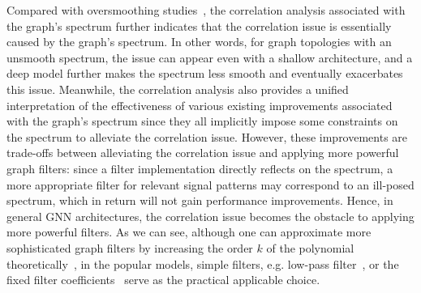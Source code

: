 \documentclass[nohyperref]{article}
\theoremstyle{plain}
\theoremstyle{definition}
\theoremstyle{remark}
\begin{document}
Compared with oversmoothing studies~\cite{li2018deeper,oono2020graph,rong2019dropedge,huang2020tackling}, the correlation analysis associated with the graph's spectrum further indicates that the correlation issue is essentially caused by the graph's spectrum. In other words, for graph topologies with an unsmooth spectrum, the issue can appear even with a shallow architecture, and a deep model further makes the spectrum less smooth and eventually exacerbates this issue. Meanwhile, the correlation analysis also provides a unified interpretation of the effectiveness of various existing improvements associated with the graph's spectrum since they all implicitly impose some constraints on the spectrum to alleviate the correlation issue. However, these improvements are trade-offs between alleviating the correlation issue and applying more powerful graph filters: since a filter implementation directly reflects on the spectrum, a more appropriate filter for relevant signal patterns may correspond to an ill-posed spectrum, which in return will not gain performance improvements. Hence, in general GNN architectures, the correlation issue becomes the obstacle to applying more powerful filters.
As we can see, although one can approximate more sophisticated graph filters by increasing the order $k$ of the polynomial theoretically~\cite{shuman2013emerging}, in the popular models, simple filters, e.g. low-pass filter~\cite{kipf2017semi,pmlr-v97-wu19e}, or the fixed filter coefficients~\cite{klicpera_predict_2019,klicpera2019diffusion} serve as the practical applicable choice.
\end{document}
